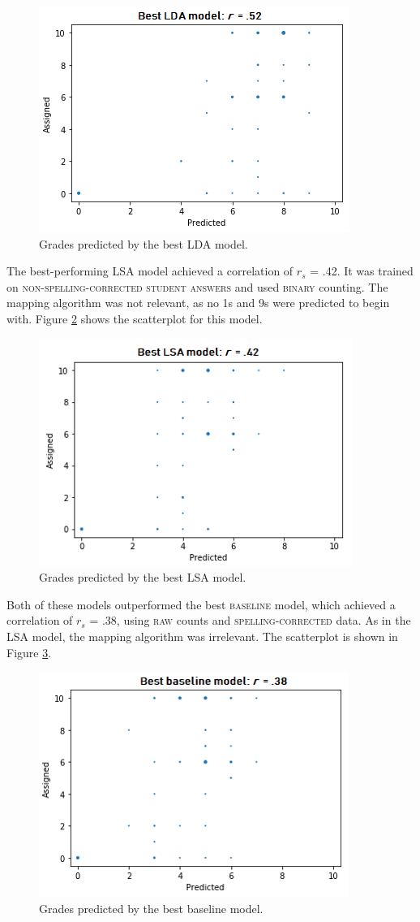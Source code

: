 \documentclass[a4paper,10pt,twoside]{article}
\begin{document}
\begin{figure}[h]
\centering
\includegraphics[width=0.5\linewidth]{"Best LDA model"}
\caption{Grades predicted by the best LDA model.}
\label{lda}
\end{figure}

\newpage
The best-performing LSA model achieved a correlation of $\textit{r}_s$ = .42. It was trained on \textsc{non-spelling-corrected} \textsc{student answers} and used \textsc{binary} counting. The mapping algorithm was not relevant, as no 1s and 9s were predicted to begin with. Figure \ref{lsa} shows the scatterplot for this model.

\begin{figure}[h]
\centering
\includegraphics[width=0.5\linewidth]{"Best LSA model"}
\caption{Grades predicted by the best LSA model.}
\label{lsa}
\end{figure}

Both of these models outperformed the best \textsc{baseline} model, which achieved a correlation of $\textit{r}_s$ = .38, using \textsc{raw} counts and \textsc{spelling-corrected} data. As in the LSA model, the mapping algorithm was irrelevant. The scatterplot is shown in Figure \ref{baseline}.

\begin{figure}[h]
\centering
\includegraphics[width=0.5\linewidth]{"Best baseline model"}
\caption{Grades predicted by the best baseline model.}
\label{baseline}
\end{figure}
\end{document}
